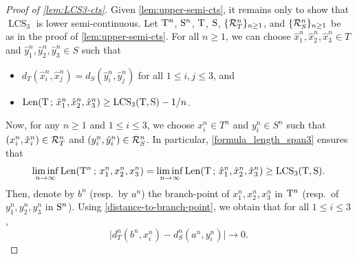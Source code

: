 \documentclass[11pt,reqno]{amsart}
\newcommand{\LCS}{\operatorname{LCS}}
\begin{document}
\begin{proof}[Proof of \cref{lem:LCS3-cts}]
Given \cref{lem:upper-semi-cts}, it remains only to show that $\LCS_3$ is lower semi-continuous. Let $\mathrm{T}^n$, $\mathrm{S}^n$, $\mathrm{T}$, $\mathrm{S}$, $\{{\mathcal R}_T^n\}_{n \geq 1}$, and $\{ {\mathcal R}_S^n\}_{n \geq 1}$ be as in the proof of \cref{lem:upper-semi-cts}. 
For all $n\geq 1$, we can choose $\hat{x}_1^n,\hat{x}_2^n,\hat{x}_3^n\in T$ and $\hat{y}_1^n,\hat{y}_2^n,\hat{y}_3^n\in S$ such that
\begin{itemize}
    \item $d_T(\hat{x}_i^n,\hat{x}_j^n)=d_S(\hat{y}_i^n,\hat{y}_j^n)$ for all $1\leq i,j\leq 3$, and
    \item $\mathrm{Len}(\rT\, ;\, \hat{x}_1^n,\hat{x}_2^n,\hat{x}_3^n)\geq \LCS_3(\rT,\rS)-1/n$.
\end{itemize}

Now, for any $n\geq 1$ and $1\leq i\leq 3$, we choose $x_i^n\in T^n$ and $y_i^n\in S^n$ such that $(x_i^n,\hat{x}_i^n)\in{\mathcal R}_T^n$ and $(y_i^n,\hat{y}_i^n)\in{\mathcal R}_S^n$. In particular, \eqref{formula_length_span3} ensures that
\begin{equation}
\label{II_tool_final}
\liminf_{n\to\infty}\mathrm{Len}(\rT^n\, ;\, x_1^n,x_2^n,x_3^n) = \liminf_{n\to\infty} \mathrm{Len}(\rT \, ;\, \hat{x}_1^n,\hat{x}_2^n,\hat{x}_3^n)\geq \LCS_3(\rT,\rS).
\end{equation}
Then, denote by $b^n$ (resp.~by $a^n$) the branch-point of $x_1^n,x_2^n,x_3^n$ in $\mathrm{T}^n$ (resp.~of $y_1^n,y_2^n,y_3^n$ in $\mathrm{S}^n$). Using \eqref{distance-to-branch-point}, we obtain that for all $1\leq i\leq 3$,
\begin{equation}
\label{II_tool}
\big|d_T^n(b^n,x_i^n)-d_S^n(a^n,y_i^n)\big|\to 0.
\end{equation}


\end{proof}
\end{document}
